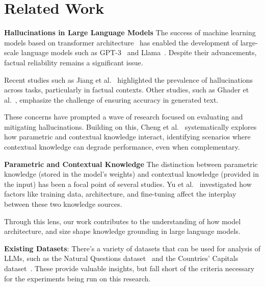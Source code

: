 \section{Related Work}
\label{related_work}



\textbf{Hallucinations in Large Language Models}
The success of machine learning models based on transformer architecture~\cite{attention_is_all_you_need} has enabled the development of large-scale language models such as GPT-3~\cite{gpt3} and Llama~\cite{llama}.
Despite their advancements, factual reliability remains a significant issue.

Recent studies such as Jiang et al.~\cite{how_can_we_know} highlighted the prevalence of hallucinations across tasks, particularly in factual contexts.
Other studies, such as Ghader et al.~\cite{can_rag_models_reason}, emphasize the challenge of ensuring accuracy in generated text.

These concerns have prompted a wave of research focused on evaluating and mitigating hallucinations.
Building on this, Cheng et al.~\cite{understanding_the_interplay} systematically explores how parametric and contextual knowledge interact, identifying scenarios where contextual knowledge can degrade performance, even when complementary.


\textbf{Parametric and Contextual Knowledge} 
The distinction between parametric knowledge (stored in the model's weights) and contextual knowledge (provided in the input) has been a focal point of several studies.
Yu et al.~\cite{factual_recall} investigated how factors like training data, architecture, and fine-tuning affect the interplay between these two knowledge sources.

Through this lens, our work contributes to the understanding of how model architecture, and size shape knowledge grounding in large language models.

\textbf{Existing Datasets}: There's a variety of datasets that can be used for analysis of LLMs, such as the Natural Questions dataset~\cite{natural_questions} and the Countries' Capitals dataset~\cite{factual_recall}.
These provide valuable insights, but fall short of the criteria necessary for the experiments being run on this research.

